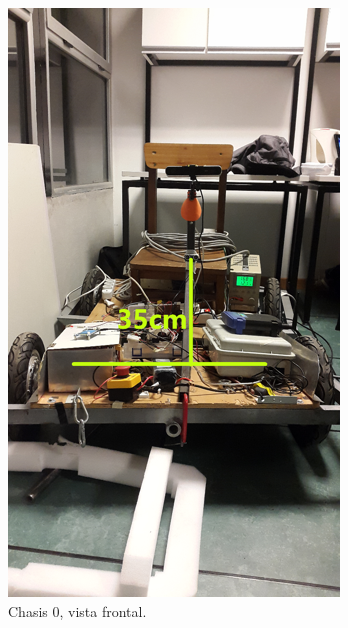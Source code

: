 \documentclass[withindex,glossary]{cam-thesis}
\begin{document}
\begin{figure}[H]
  \centering
  \begin{minipage}[b]{0.4\textwidth}
    \includegraphics[width=\textwidth]{images/Chasis0_FRONT}
    \caption[Chasis 0 - Vista Frontal]{Chasis 0, vista frontal.}
    \label{fig:vistaFrontal}
  \end{minipage}
  \hfill
  \begin{minipage}[b]{0.4\textwidth}

\end{minipage}
\end{figure}
\end{document}
